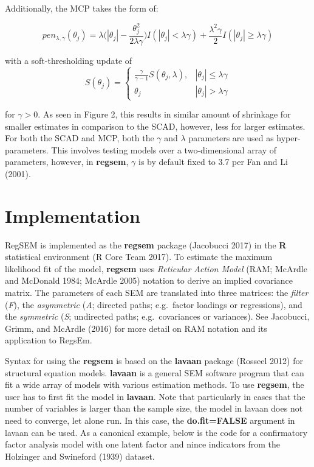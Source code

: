 Additionally, the MCP takes the form of:

\[
pen_{\lambda,\gamma}(\theta_{j}) = \lambda\bigg(|\theta_{j}|-\frac{\theta_{j}^{2}}{2\lambda\gamma}\bigg)I(|\theta_{j}|<\lambda\gamma) +\frac{\lambda^{2}\gamma}{2}I(|\theta_{j}|\geq \lambda\gamma)
\]

with a soft-thresholding update of \[
S(\theta_{j})= 
\begin{cases}
\frac{\gamma}{\gamma-1}S(\theta_{j},\lambda),&  |\theta_{j}| \leq \lambda\gamma\\
\theta_{j} & |\theta_{j}| > \lambda \gamma
\end{cases}
\]

for \(\gamma > 0\). As seen in Figure 2, this results in similar amount
of shrinkage for smaller estimates in comparison to the SCAD, however,
less for larger estimates. For both the SCAD and MCP, both the
\(\gamma\) and \(\lambda\) parameters are used as hyper-parameters. This
involves testing models over a two-dimensional array of parameters,
however, in \textbf{regsem}, \(\gamma\) is by default fixed to 3.7 per
Fan and Li (2001).

\section{Implementation}\label{implementation}

RegSEM is implemented as the \textbf{regsem} package (Jacobucci 2017) in
the \textbf{R} statistical environment (R Core Team 2017). To estimate
the maximum likelihood fit of the model, \textbf{regsem} uses
\textit{Reticular Action Model} (RAM; McArdle and McDonald 1984; McArdle
2005) notation to derive an implied covariance matrix. The parameters of
each SEM are translated into three matrices: the \textit{filter}
(\textit{F}), the \textit{asymmetric} (\textit{A}; directed paths;
e.g.~factor loadings or regressions), and the \textit{symmetric}
(\textit{S}; undirected paths; e.g.~covariances or variances). See
Jacobucci, Grimm, and McArdle (2016) for more detail on RAM notation and
its application to RegsEm.

Syntax for using the \textbf{regsem} is based on the \textbf{lavaan}
package (Rosseel 2012) for structural equation models. \textbf{lavaan}
is a general SEM software program that can fit a wide array of models
with various estimation methods. To use \textbf{regsem}, the user has to
first fit the model in \textbf{lavaan}. Note that particularly in cases
that the number of variables is larger than the sample size, the model
in lavaan does not need to converge, let alone run. In this case, the
\textbf{do.fit=FALSE} argument in lavaan can be used. As a canonical
example, below is the code for a confirmatory factor analysis model with
one latent factor and nince indicators from the Holzinger and Swineford
(1939) dataset.

